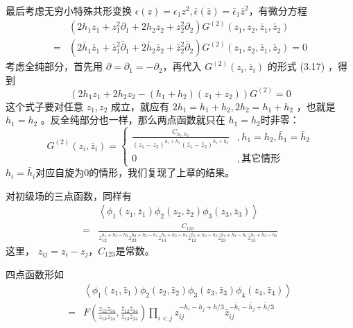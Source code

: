 最后考虑无穷小特殊共形变换 $\epsilon(z)=\epsilon_{1} z^{2}, \bar{\epsilon}(\bar{z})=\bar{\epsilon}_{1} \bar{z}^{2} $，有微分方程
\begin{equation}
\begin{aligned} &\left(2 h_{1} z_{1}+z_{1}^{2} \partial_{1}+2 h_{2} z_{2}+z_{2}^{2} \partial_{2}\right) G^{(2)}\left(z_{1}, z_{2}, \bar{z}_{1}, \bar{z}_{2}\right) \\ =&\left(2 \bar{h}_{1} \bar{z}_{1}+\bar{z}_{1}^{2} \bar{\partial}_{1}+2 \bar{h}_{2} \bar{z}_{2}+\bar{z}_{2}^{2} \bar{\partial}_{2}\right) G^{(2)}\left(z_{1}, z_{2}, \bar{z}_{1}, \bar{z}_{2}\right)=0 \end{aligned}
\end{equation}
考虑全纯部分，首先用 $\partial=\partial_{1}=-\partial_{2} $，再代入 $G^{(2)}\left(z_{i}, \bar{z}_{i}\right)$ 的形式 (3.17) ，得到
\[
\left(2 h_{1} z_{1}+2 h_{2} z_{2}-\left(h_{1}+h_{2}\right)\left(z_{1}+z_{2}\right)\right) G^{(2)}=0
\]
这个式子要对任意 $z_1,z_2$ 成立，就应有 $2 h_{1}=h_{1}+h_{2}, 2 h_{2}=h_{1}+h_{2}$ ，也就是$ h_1=h_2$ 。反全纯部分也一样，那么两点函数就只在 $h_1=h_2 $时非零：
\begin{equation}
G^{(2)}\left(z_{i}, \bar{z}_{i}\right)=\left\{\begin{array}{cl} \frac{C_{h_{1}, h_{2}}}{\left(z_{1}-z_{2}\right)^{h_{1}+h_{2}}\left(\bar{z}_{1}-\bar{z}_{2}\right)^{\bar{h}_{1}+\bar{h}_{2}}}&, h_{1}=h_{2}, \bar{h}_{1}=\bar{h}_{2} \\ 0 &,其它情形 \end{array}
\right.\end{equation}
$h_i=\bar{h}_i $对应自旋为0的情形，我们复现了上章的结果。

对初级场的三点函数，同样有
\begin{equation}
\begin{aligned} &\left\langle\phi_{1}\left(z_{1}, \bar{z}_{1}\right) \phi_{2}\left(z_{2}, \bar{z}_{2}\right) \phi_{3}\left(z_{3}, \bar{z}_{3}\right)\right\rangle \\ =& \frac{C_{123}}{z_{12}^{h_{1}+h_{2}-h_{3}} z_{23}^{h_{2}+h_{3}-h_{1}} z_{13}^{h_{1}+h_{3}-h_{2}} \bar{z}_{12}^{\bar{h}_{1}+\bar{h}_{2}-\bar{h}_{3}} \bar{z}_{23}^{\bar{h}_{2}+\bar{h}_{3}-\bar{h}_{1}} \bar{z}_{13}^{\bar{h}_{1}+\bar{h}_{3}-\bar{h}_{2}}} \end{aligned}
\end{equation}
这里， $z_{ij}=z_i-z_j ， C_{123} $是常数。

四点函数形如
\begin{equation}
\begin{aligned} &\left\langle\phi_{1}\left(z_{1}, \bar{z}_{1}\right) \phi_{2}\left(z_{2}, \bar{z}_{2}\right) \phi_{3}\left(z_{3}, \bar{z}_{3}\right) \phi_{4}\left(z_{4}, \bar{z}_{4}\right)\right\rangle \\ =& F\left(\frac{z_{12} z_{34}}{z_{13} z_{24}}, \frac{\bar{z}_{12} \bar{z}_{34}}{\bar{z}_{13} \bar{z}_{24}}\right) \prod_{i<j} z_{i j}^{-h_{i}-h_{j}+h / 3} \bar{z}_{i j}^{-\bar{h}_{i}-\bar{h}_{j}+\bar{h} / 3} \end{aligned}
\end{equation}

